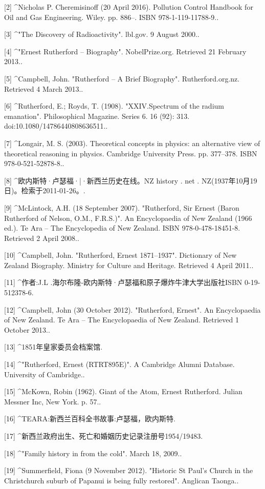 [2]
^Nicholas P. Cheremisinoff (20 April 2016). Pollution Control Handbook for Oil and Gas Engineering. Wiley. pp. 886–. ISBN 978-1-119-11788-9..

[3]
^"The Discovery of Radioactivity". lbl.gov. 9 August 2000..

[4]
^"Ernest Rutherford – Biography". NobelPrize.org. Retrieved 21 February 2013..

[5]
^Campbell, John. "Rutherford – A Brief Biography". Rutherford.org.nz. Retrieved 4 March 2013..

[6]
^Rutherford, E.; Royds, T. (1908). "XXIV.Spectrum of the radium emanation". Philosophical Magazine. Series 6. 16 (92): 313. doi:10.1080/14786440808636511..

[7]
^Longair, M. S. (2003). Theoretical concepts in physics: an alternative view of theoretical reasoning in physics. Cambridge University Press. pp. 377–378. ISBN 978-0-521-52878-8..

[8]
^欧内斯特·卢瑟福·|·新西兰历史在线。NZ history . net . NZ(1937年10月19日)。检索于2011-01-26。.

[9]
^McLintock, A.H. (18 September 2007). "Rutherford, Sir Ernest (Baron Rutherford of Nelson, O.M., F.R.S.)". An Encyclopaedia of New Zealand (1966 ed.). Te Ara – The Encyclopedia of New Zealand. ISBN 978-0-478-18451-8. Retrieved 2 April 2008..

[10]
^Campbell, John. "Rutherford, Ernest 1871–1937". Dictionary of New Zealand Biography. Ministry for Culture and Heritage. Retrieved 4 April 2011..

[11]
^作者:J.L .海尔布隆-欧内斯特·卢瑟福和原子爆炸牛津大学出版社ISBN 0-19-512378-6.

[12]
^Campbell, John (30 October 2012). "Rutherford, Ernest". An Encyclopaedia of New Zealand. Te Ara – The Encyclopaedia of New Zealand. Retrieved 1 October 2013..

[13]
^1851年皇家委员会档案馆.

[14]
^"Rutherford, Ernest (RTRT895E)". A Cambridge Alumni Database. University of Cambridge..

[15]
^McKown, Robin (1962). Giant of the Atom, Ernest Rutherford. Julian Messner Inc, New York. p. 57..

[16]
^TEARA:新西兰百科全书故事:卢瑟福，欧内斯特.

[17]
^新西兰政府出生、死亡和婚姻历史记录注册号1954/19483.

[18]
^"Family history in from the cold". March 18, 2009..

[19]
^Summerfield, Fiona (9 November 2012). "Historic St Paul's Church in the Christchurch suburb of Papanui is being fully restored". Anglican Taonga..

